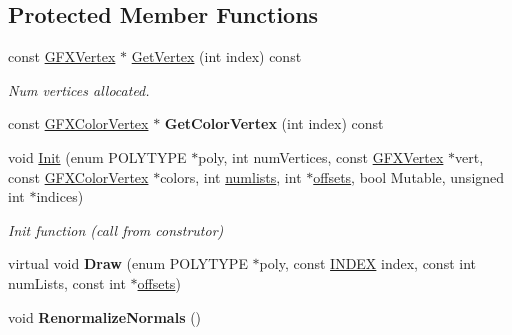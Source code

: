 \subsection*{Protected Member Functions}
\begin{DoxyCompactItemize}
\item 
const \hyperlink{structGFXVertex}{G\+F\+X\+Vertex} $\ast$ \hyperlink{classGFXVertexList_aaa9bfa28a3bf3c0d19b2d779754e7364}{Get\+Vertex} (int index) const \hypertarget{classGFXVertexList_aaa9bfa28a3bf3c0d19b2d779754e7364}{}\label{classGFXVertexList_aaa9bfa28a3bf3c0d19b2d779754e7364}

\begin{DoxyCompactList}\small\item\em Num vertices allocated. \end{DoxyCompactList}\item 
const \hyperlink{structGFXColorVertex}{G\+F\+X\+Color\+Vertex} $\ast$ {\bfseries Get\+Color\+Vertex} (int index) const \hypertarget{classGFXVertexList_ad5cc08c44fdecd01048d98c02be8af6c}{}\label{classGFXVertexList_ad5cc08c44fdecd01048d98c02be8af6c}

\item 
void \hyperlink{classGFXVertexList_a07293ea055c210e97471c7836e466537}{Init} (enum P\+O\+L\+Y\+T\+Y\+PE $\ast$poly, int num\+Vertices, const \hyperlink{structGFXVertex}{G\+F\+X\+Vertex} $\ast$vert, const \hyperlink{structGFXColorVertex}{G\+F\+X\+Color\+Vertex} $\ast$colors, int \hyperlink{classGFXVertexList_a50b552e54f117f7456f3cb618c076190}{numlists}, int $\ast$\hyperlink{classGFXVertexList_a0310e1bd4dbc7bfb1240b200368ce8c9}{offsets}, bool Mutable, unsigned int $\ast$indices)\hypertarget{classGFXVertexList_a07293ea055c210e97471c7836e466537}{}\label{classGFXVertexList_a07293ea055c210e97471c7836e466537}

\begin{DoxyCompactList}\small\item\em Init function (call from construtor) \end{DoxyCompactList}\item 
virtual void {\bfseries Draw} (enum P\+O\+L\+Y\+T\+Y\+PE $\ast$poly, const \hyperlink{unionGFXVertexList_1_1INDEX}{I\+N\+D\+EX} index, const int num\+Lists, const int $\ast$\hyperlink{classGFXVertexList_a0310e1bd4dbc7bfb1240b200368ce8c9}{offsets})\hypertarget{classGFXVertexList_aed3abd3fc8ce0f1f17c1ffba249f89b2}{}\label{classGFXVertexList_aed3abd3fc8ce0f1f17c1ffba249f89b2}

\item 
void {\bfseries Renormalize\+Normals} ()\hypertarget{classGFXVertexList_afb18a6de62ade4d4f2e9d0b97f477e25}{}\label{classGFXVertexList_afb18a6de62ade4d4f2e9d0b97f477e25}

\end{DoxyCompactItemize}
